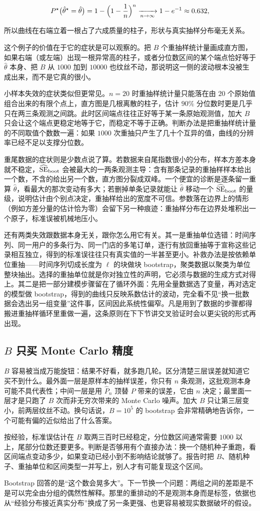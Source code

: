 \[
P^\star\bigl(\hat\theta^\star=\hat\theta\bigr)=1-\Bigl(1-\frac1n\Bigr)^{n}\xrightarrow[n\to\infty]{}1-e^{-1}\approx0.632,
\]

所以曲线在右端立着一根占了六成质量的柱子，形状与真实抽样分布毫无关系。

这个例子的价值在于它的症状是可以观察的。把 \(B\) 个重抽样统计量画成直方图，如果右端（或左端）出现一根异常高的柱子，或者分位数区间的某个端点恰好等于 \(\hat\theta\) 本身、把 \(B\) 从 \(1000\) 加到 \(10000\) 也纹丝不动，那说明这一侧的波动根本没被生成出来，而不是它真的很小。

小样本失效的症状类似但更常见。\(n=20\) 时重抽样统计量只能落在由 \(20\) 个原始值组合出来的有限个点上，直方图是几根离散的柱子，估计 \(90\%\) 分位数时更是几乎只在两三条观测之间跳。此时区间端点往往正好等于某一条原始观测值，加大 \(B\) 只会让这个端点更稳定地等于它，而稳定不等于正确。判断办法是把重抽样统计量的不同取值个数数一遍：如果 \(1000\) 次重抽只产生了几十个互异的值，曲线的分辨率已经不足以支撑分位数。

重尾数据的症状则是少数点说了算。若数据来自尾指数很小的分布，样本方差本身就不稳定，\(\widehat{\operatorname{SE}}_{\mathrm{boot}}\) 会被最大的一两条观测主导：含有那条记录的重抽样样本给出一个数，不含的给出另一个数，直方图分裂成双峰。一个便宜的诊断是逐条留一重算 \(\hat\theta\)，看最大的那次变动有多大；若删掉单条记录就能让 \(\hat\theta\) 移动一个 \(\widehat{\operatorname{SE}}_{\mathrm{boot}}\) 的量级，说明估计由个别点决定，重抽样给出的宽度不可信。参数落在边界上的情形（例如方差分量的估计恰为零）会留下另一种痕迹：重抽样分布在边界处堆积出一个原子，标准误被机械地压小。

还有两类失效跟数据本身无关，跟你怎么用它有关。其一是重抽单位选错：时间序列、同一用户的多条行为、同一门店的多笔订单，逐行有放回重抽等于宣称这些记录相互独立，得到的标准误往往只有真实值的一半甚至更小。补救办法是按依赖单位重抽——时间序列切成长度为 \(\ell\) 的块做块 bootstrap，聚类数据以聚类为单位整块抽出。选择的重抽单位就是你对独立性的声明，它必须与数据的生成方式对得上。其二是把一部分建模步骤留在了循环外面：先用全量数据选了变量，再对选定的模型做 bootstrap，得到的曲线只反映系数估计的波动，完全看不见``换一批数据会选出另一组变量''这件事，区间因此系统性偏窄。凡是用到了数据的步骤都得搬进重抽样循环里重做一遍，这条原则在下下节讲交叉验证时会以更尖锐的形式再出现。

\subsection{\(B\) 只买 Monte Carlo 精度}

\(B\) 容易被当成万能旋钮：结果不好看，就多跑几轮。区分清楚三层误差就知道它买不到什么。最外面一层是原样本的抽样误差，你只有 \(n\) 条观测，这批观测本身可能不具代表性；中间一层是用 \(\hat P_n\) 顶替 \(P\) 带来的误差，它由 \(n\) 决定；最里面一层才是只跑了 \(B\) 次而非无穷次带来的 Monte Carlo 噪声。加大 \(B\) 只让第三层变小，前两层纹丝不动。换句话说，\(B=10^5\) 的 bootstrap 会非常精确地告诉你，一个可能有偏的近似给出了什么答案。

按经验，标准误估计在 \(B\) 取两三百时已经稳定，分位数区间通常需要 \(1000\) 以上，尾部分位数还要更多。判断是否够用有个直接办法：换一个随机种子重跑，看区间端点变动多少，如果变动已经小到不影响结论就够了。报告时把 \(B\)、随机种子、重抽单位和区间类型一并写上，别人才有可能复现这个区间。

Bootstrap 回答的是``这个数会晃多大''。下一节换一个问题：两组之间的差距是不是可以完全由分组的偶然性解释。那里的重排动的不是观测本身而是标签，依据也从``经验分布接近真实分布''换成了另一条更强、也更容易被现实数据破坏的假设。
